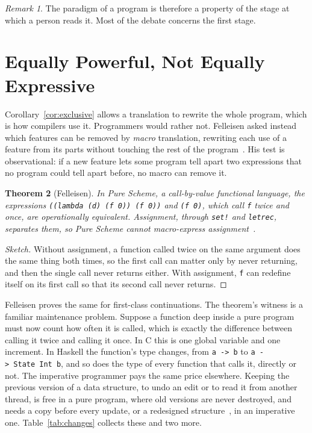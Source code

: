 \documentclass[11pt]{article}
\let\oldsection\section
\renewcommand{\section}{\Needspace{0.25\textheight}\oldsection}
\newtheorem{theorem}{Theorem}[section]
\theoremstyle{definition}
\theoremstyle{remark}
\newtheorem{remark}[theorem]{Remark}
\newcommand{\code}[1]{\texttt{\upshape #1}}
\begin{document}
\begin{remark}
  The paradigm of a program is therefore a property of the stage at which
  a person reads it. Most of the debate concerns the first stage.
\end{remark}

\section{Equally Powerful, Not Equally Expressive}\label{sec:express}

Corollary~\ref{cor:exclusive} allows a translation to rewrite the whole
program, which is how compilers use it. Programmers would rather not.
Felleisen asked instead which features can be removed by \emph{macro}
translation, rewriting each use of a feature from its parts without
touching the rest of the program~\cite{felleisen}. His test is
observational: if a new feature lets some program tell apart two
expressions that no program could tell apart before, no macro can remove
it.

\begin{theorem}[Felleisen]\label{thm:felleisen}
  In Pure Scheme, a call-by-value functional language, the expressions
  \code{((lambda (d) (f 0)) (f 0))} and \code{(f 0)}, which
  call \code{f} twice and once, are operationally equivalent.
  Assignment, through \code{set!} and \code{letrec}, separates
  them, so Pure Scheme cannot macro-express assignment~\cite{felleisen}.
\end{theorem}

\begin{proof}[Sketch]
  Without assignment, a function called twice on the same argument does
  the same thing both times, so the first call can matter only by never
  returning, and then the single call never returns either. With
  assignment, \code{f} can redefine itself on its first call so that
  its second call never returns.
\end{proof}

Felleisen proves the same for first-class continuations. The theorem's
witness is a familiar maintenance problem. Suppose a function deep
inside a pure program must now count how often it is called, which is
exactly the difference between calling it twice and calling it once. In
C this is one global variable and one increment. In Haskell the
function's type changes, from \code{a~->~b} to
\code{a~->~State~Int~b}, and so does the type of every function that
calls it, directly or not. The imperative programmer pays the same price
elsewhere. Keeping the previous version of a data structure, to undo an
edit or to read it from another thread, is free in a pure program, where
old versions are never destroyed, and needs a copy before every update,
or a redesigned structure~\cite{dsst}, in an imperative one.
Table~\ref{tab:changes} collects these and two more.
\end{document}
